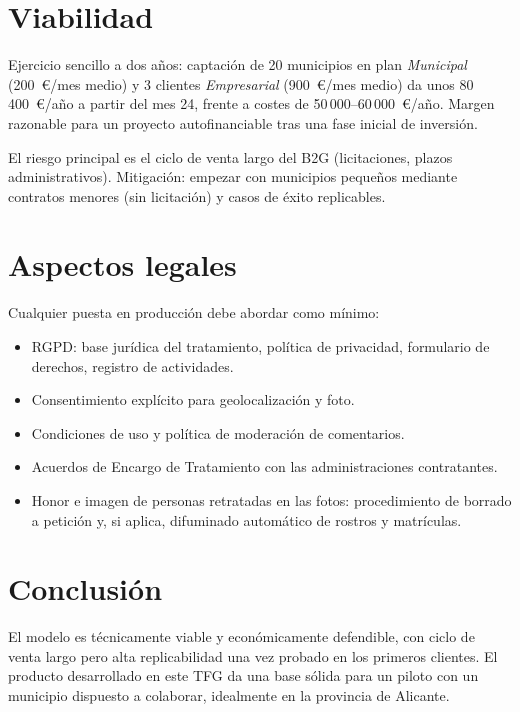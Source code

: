 \section*{Viabilidad}

Ejercicio sencillo a dos años: captación de 20 municipios en plan \textit{Municipal} (200~€/mes medio) y 3 clientes \textit{Empresarial} (900~€/mes medio) da unos 80\,400~€/año a partir del mes 24, frente a costes de 50\,000--60\,000~€/año. Margen razonable para un proyecto autofinanciable tras una fase inicial de inversión.

El riesgo principal es el ciclo de venta largo del B2G (licitaciones, plazos administrativos). Mitigación: empezar con municipios pequeños mediante contratos menores (sin licitación) y casos de éxito replicables.


\section*{Aspectos legales}

Cualquier puesta en producción debe abordar como mínimo:

\begin{itemize}
  \item RGPD: base jurídica del tratamiento, política de privacidad, formulario de derechos, registro de actividades.
  \item Consentimiento explícito para geolocalización y foto.
  \item Condiciones de uso y política de moderación de comentarios.
  \item Acuerdos de Encargo de Tratamiento con las administraciones contratantes.
  \item Honor e imagen de personas retratadas en las fotos: procedimiento de borrado a petición y, si aplica, difuminado automático de rostros y matrículas.
\end{itemize}


\section*{Conclusión}

El modelo es técnicamente viable y económicamente defendible, con ciclo de venta largo pero alta replicabilidad una vez probado en los primeros clientes. El producto desarrollado en este TFG da una base sólida para un piloto con un municipio dispuesto a colaborar, idealmente en la provincia de Alicante.
